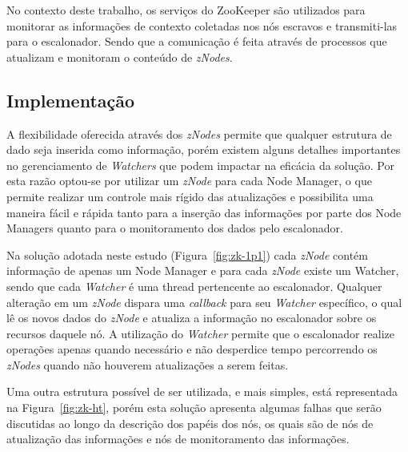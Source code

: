 No contexto deste trabalho, os serviços do ZooKeeper são utilizados para monitorar as informações de contexto coletadas nos nós escravos e transmiti-las para o escalonador. Sendo que a comunicação é feita através de processos que atualizam e monitoram o conteúdo de \textit{zNodes}.

\subsection{Implementação}
A flexibilidade oferecida através dos \textit{zNodes} permite que qualquer estrutura de dado seja inserida como informação, porém existem alguns detalhes importantes no gerenciamento de \textit{Watchers} que podem impactar na eficácia da solução. Por esta razão optou-se por utilizar um \textit{zNode} para cada Node Manager, o que permite realizar um controle mais rígido das atualizações e possibilita uma maneira fácil e rápida tanto para a inserção das informações por parte dos Node Managers quanto para o monitoramento dos dados pelo escalonador.

Na solução adotada neste estudo (Figura~\ref{fig:zk-1p1}) cada \textit{zNode} contém informação de apenas um Node Manager e para cada \textit{zNode} existe um Watcher, sendo que cada \textit{Watcher} é uma thread pertencente ao escalonador. Qualquer alteração em um \textit{zNode} dispara uma \textit{callback} para seu \textit{Watcher} específico, o qual lê os novos dados do \textit{zNode} e atualiza a informação no escalonador sobre os recursos daquele nó. A utilização do \textit{Watcher} permite que o escalonador realize operações apenas quando necessário e não desperdice tempo percorrendo os \textit{zNodes} quando não houverem atualizações a serem feitas.

Uma outra estrutura possível de ser utilizada, e mais simples, está representada na Figura~\ref{fig:zk-ht}, porém esta solução apresenta algumas falhas que serão discutidas ao longo da descrição dos papéis dos nós, os quais são de nós de atualização das informações e nós de monitoramento das informações.

%




